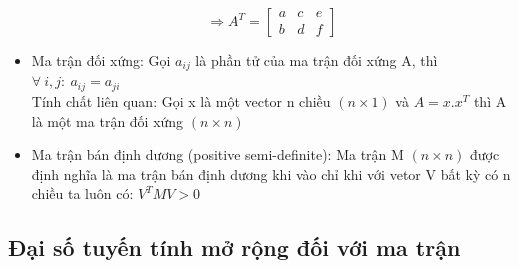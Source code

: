 \begin{itemize}
\[\Rightarrow A^T =
\begin{bmatrix}
a & c & e\\
b & d & f
\end{bmatrix}
\]
\item Ma trận đối xứng: Gọi $a_{ij}$  là phần tử của ma trận đối xứng A, thì
$\forall\:i,j:\:a_{ij} = a_{ji}$\\
Tính chất liên quan: Gọi x là một vector n chiều $(n \times 1)$ và $A=x.x^T$
thì A là một ma trận đối xứng $(n \times n)$
\item Ma trận bán định dương (positive semi-definite): Ma trận M $(n \times n)$
được định nghĩa là ma trận bán định dương khi vào chỉ khi với vetor V bất kỳ có
n chiều ta luôn có: $V^T MV>0$
\end{itemize}

\subsection{ Đại số tuyến tính mở rộng đối với ma trận}
